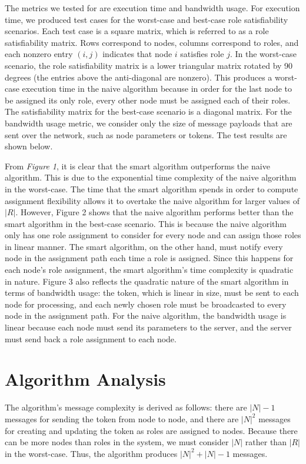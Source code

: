 \documentclass[11pt]{article}
\begin{document}
\begin{multicols}{2}
The metrics we tested for are execution time and bandwidth usage. For execution time, we produced test cases for the worst-case and best-case role satisfiability scenarios. Each test case is a square matrix, which is referred to as a role satisfiability matrix. Rows correspond to nodes, columns correspond to roles, and each nonzero entry $(i, j)$ indicates that node $i$ satisfies role $j$. In the worst-case scenario, the role satisfiability matrix is a lower triangular matrix rotated by 90 degrees (the entries above the anti-diagonal are nonzero). This produces a worst-case execution time in the naive algorithm because in order for the last node to be assigned its only role, every other node must be assigned each of their roles. The satisfiability matrix for the best-case scenario is a diagonal matrix. For the bandwidth usage metric, we consider only the size of message payloads that are sent over the network, such as node parameters or tokens. The test results are shown below.


From \textit{Figure 1}, it is clear that the smart algorithm outperforms the naive algorithm. This is due to the exponential time complexity of the naive algorithm in the worst-case. The time that the smart algorithm spends in order to compute assignment flexibility allows it to overtake the naive algorithm for larger values of $|R|$. However, Figure 2 shows that the naive algorithm performs better than the smart algorithm in the best-case scenario. This is because the naive algorithm only has one role assignment to consider for every node and can assign those roles in linear manner. The smart algorithm, on the other hand, must notify every node in the assignment path each time a role is assigned. Since this happens for each node's role assignment, the smart algorithm's time complexity is quadratic in nature. Figure 3 also reflects the quadratic nature of the smart algorithm in terms of bandwidth usage: the token, which is linear in size, must be sent to each node for processing, and each newly chosen role must be broadcasted to every node in the assignment path. For the naive algorithm, the bandwidth usage is linear because each node must send its parameters to the server, and the server must send back a role assignment to each node.
\section{Algorithm Analysis}
The algorithm's message complexity is derived as follows: there are $|N| - 1$ messages for sending the token from node to node, and there are $|N|^2$  messages for creating and updating the token as roles are assigned to nodes. Because there can be more nodes than roles in the system, we must consider $|N|$ rather than $|R|$ in the worst-case. Thus, the algorithm produces $|N|^2 + |N| - 1$ messages.


\end{multicols}
\end{document}
